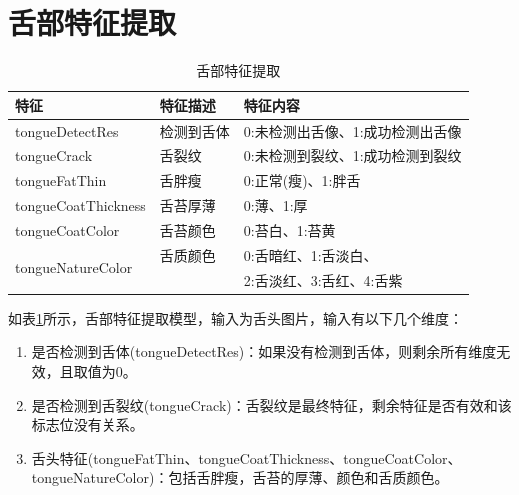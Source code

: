 \section{舌部特征提取}
\label{subsec:tongue-feature}

\begin{table}[h]
    \centering
    \caption{舌部特征提取}
    \begin{tabular}{lll}
        \toprule
        特征 & 特征描述 & 特征内容 \\
        \midrule
        tongueDetectRes & 检测到舌体 & 0:未检测出舌像、1:成功检测出舌像 \\
        tongueCrack & 舌裂纹 & 0:未检测到裂纹、1:成功检测到裂纹 \\
        tongueFatThin & 舌胖瘦 & 0:正常(瘦)、1:胖舌 \\
        tongueCoatThickness & 舌苔厚薄 & 0:薄、1:厚 \\
        tongueCoatColor & 舌苔颜色 & 0:苔白、1:苔黄 \\
        \multirow{2}{*}{tongueNatureColor} & 舌质颜色 & 0:舌暗红、1:舌淡白、     \\ \cline{3-2}
                                            &        & 2:舌淡红、3:舌红、4:舌紫    \\ \hline
        \bottomrule
    \end{tabular}
    \label{tab:tongue-feature}
\end{table}

如表\ref{tab:tongue-feature}所示，舌部特征提取模型，输入为舌头图片，输入有以下几个维度：
\begin{enumerate}
    \item 是否检测到舌体(tongueDetectRes)：如果没有检测到舌体，则剩余所有维度无效，且取值为0。

    \item 是否检测到舌裂纹(tongueCrack)：舌裂纹是最终特征，剩余特征是否有效和该标志位没有关系。

    \item 舌头特征(tongueFatThin、tongueCoatThickness、tongueCoatColor、tongueNatureColor)：包括舌胖瘦，舌苔的厚薄、颜色和舌质颜色。

\end{enumerate}

